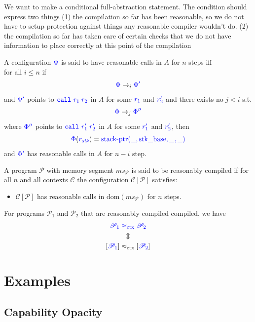 \documentclass[a3paper]{article}
\newcommand{\dom}{\mathrm{dom}}
\newcommand{\sconeq}{\mathrel{\src{\approx_{\mathrm{ctx}}}}}
\newcommand{\tconeq}{\mathrel{\approx_{\mathrm{ctx}}}}
\newcommand{\sourcecolor}{\color{blue}}
\newcommand{\src}[1]{{\sourcecolor #1}}
\newcommand{\zinstr}[1]{\texttt{#1}}
\newcommand{\scall}[3][]{  
\ifthenelse{\equal{#2#3}{}}
  {\ensuremath{\zinstr{\src{call}}_{#1}}}
  {\ensuremath{\zinstr{\src{call}}_{#1} \; #2 \; #3}}
}
\newcommand{\stkptr}[1]{\mathrm{stack\text{-}ptr}(#1)}
\newcommand{\program}{\mathscr{P}}
\newcommand{\context}{\mathscr{C}}
\newcommand{\plug}[2]{#1[#2]}
\newcommand{\step}{\rightarrow}
\newcommand{\nstep}[1][n]{\step_{#1}}
\newcommand{\var}[1]{\mathit{#1}}
\newcommand{\ms}{\var{ms}}
\newcommand{\stk}{\var{stk}}
\newcommand{\constant}[1]{\mathrm{#1}}
\newcommand{\stkb}{\constant{stk\_base}}
\newcommand{\comp}[1]{[#1]}
\begin{document}
We want to make a conditional full-abstraction statement. The condition should express two things (1) the compilation so far has been reasonable, so we do not have to setup protection against things any reasonable compiler wouldn't do. (2) the compilation so far has taken care of certain checks that we do not have information to place correctly at this point of the compilation
\begin{definition}
  \label{def:check-stack-addr-before-call}
  A configuration $\src{\Phi}$ is said to have reasonable calls in $A$ for $n$ steps iff\\
  for all $i \leq n$ if
  \[
    \src{\Phi} \nstep[i] \src{\Phi'}
  \]
  and $\src{\Phi'}$ points to $\src{\scall{r_1}{r_2}}$ in $A$ for some $\src{r_1}$ and $\src{r_2'}$ and there exists no $j<i$ s.t.
  \[
    \src{\Phi} \nstep[j] \src{\Phi''}
  \]
  where $\src{\Phi''}$ points to $\src{\scall{r_1'}{r_2'}}$ in $A$ for some $\src{r_1'}$ and $\src{r_2'}$,
  then
  \[
    \src{\Phi}(\src{r_\stk}) = \src{\stkptr{\_,\stkb,\_,\_}}
  \]
  and $\src{\Phi'}$ has reasonable calls in $A$ for $n-i$ step.
\end{definition}

\begin{definition}
  A program $\program$ with memory segment $\ms_\program$ is said to be reasonably compiled if for all $n$ and all contexts $\context$ the configuration $\plug{\context}{\program}$ satisfies:
  \begin{itemize}
  \item $\plug{\context}{\program}$ has reasonable calls in $\dom(\ms_\program)$ for $n$ steps.
  \end{itemize}
\end{definition}

\begin{theorem}
  \label{thm:full-abstraction}
  For programs $\program_1$ and $\program_2$ that are reasonably compiled compiled, we have
  \begin{gather*}
    \src{\program_1} \sconeq \src{\program_2}\\
    \Updownarrow\\
    \comp{\src{\program_1}} \tconeq \comp{\src{\program_2}}
  \end{gather*}
\end{theorem}

\clearpage
\section{Examples}
\subsection{Capability Opacity}
\label{subsec:capability-opacity}
\end{document}
